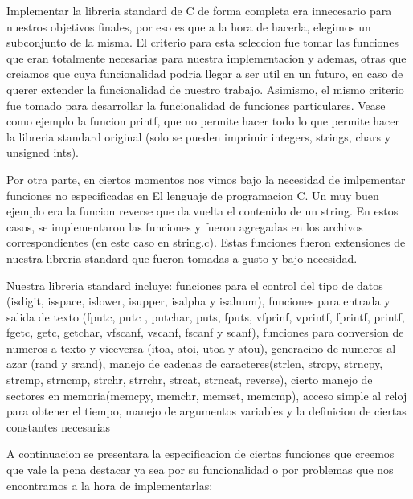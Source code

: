 \documentclass[a4paper,10pt]{article}
\begin{document}
    Implementar la libreria standard de C de forma completa era innecesario para nuestros objetivos finales, por eso es que a la hora de hacerla, elegimos un subconjunto de la misma. El criterio para esta seleccion fue tomar las funciones que eran totalmente necesarias para nuestra implementacion y ademas, otras que creiamos que cuya funcionalidad podria llegar a ser util en un futuro, en caso de querer extender la funcionalidad de nuestro trabajo.
    Asimismo, el mismo criterio fue tomado para desarrollar la funcionalidad de funciones particulares. Vease como ejemplo la funcion printf, que no permite hacer todo lo que permite hacer la libreria standard original (solo se pueden imprimir integers, strings, chars y unsigned ints).

    Por otra parte, en ciertos momentos nos vimos bajo la necesidad de imlpementar funciones no especificadas en El lenguaje de programacion C. Un muy buen ejemplo era la funcion reverse que da vuelta el contenido de un string. En estos casos, se implementaron las funciones y fueron agregadas en los archivos correspondientes (en este caso en string.c). Estas funciones fueron extensiones de nuestra libreria standard que fueron tomadas a gusto y bajo necesidad.

    Nuestra libreria standard incluye: funciones para el control del tipo de datos (isdigit, isspace, islower, isupper, isalpha y isalnum), funciones para entrada y salida de texto (fputc, putc , putchar, puts, fputs, vfprinf, vprintf, fprintf, printf, fgetc, getc, getchar, vfscanf, vscanf, fscanf y scanf), funciones para conversion de numeros a texto y viceversa (itoa, atoi, utoa y atou), generacino de numeros al azar (rand y srand), manejo de cadenas de caracteres(strlen, strcpy, strncpy, strcmp, strncmp, strchr, strrchr, strcat, strncat, reverse), cierto manejo de sectores en memoria(memcpy, memchr, memset, memcmp), acceso simple al reloj para obtener el tiempo, manejo de argumentos variables y la definicion de ciertas constantes necesarias

    A continuacion se presentara la especificacion de ciertas funciones que creemos que vale la pena destacar ya sea por su funcionalidad o por problemas que nos encontramos a la hora de implementarlas:
\end{document}
